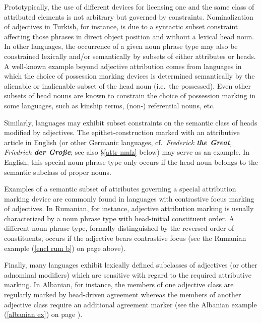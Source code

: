 Prototypically, the use of different devices for licensing one and the same class of attributed elements is not arbitrary but governed by constraints. Nominalization of adjectives in Turkish, for instance, is due to a syntactic subset constraint affecting those phrases in direct object position and without a lexical head noun. In other languages, the occurrence of a given noun phrase type may also be constrained lexically and/or semantically by subsets of either attributes or heads. A well-known example beyond adjective attribution comes from languages in which the choice of possession marking devices is determined semantically by the alienable or inalienable subset of the head noun (i.e.~the possessed). Even other subsets of head nouns are known to constrain the choice of possession marking in some languages, such as kinship terms, (non-) referential nouns, etc.

Similarly, languages may exhibit subset constraints on the semantic class of heads modified by adjectives. The epithet-construction marked with an attributive article in English (or other Germanic languages, cf.~\textit{Frederick \textbf{the Great}, Friedrich \textbf{der Große}}; see also \S\ref{attr nmlz} below) may serve as an example. In English, this special noun phrase type only occurs if the head noun belongs to the semantic subclass of proper nouns. 

Examples of a semantic subset of attributes governing a special attribution marking device are commonly found in languages with contrastive focus marking of adjectives. In Rumanian, for instance, adjective attribution marking is usually characterized by a noun phrase type with head-initial constituent order. A different noun phrase type, formally distinguished by the reversed order of constituents, occurs if the adjective bears contrastive focus (see the Rumanian example (\ref{encl rum b}) on page \pageref{encl rum b} above).

Finally, many languages exhibit lexically defined subclasses of adjectives (or other adnominal modifiers) which are sensitive with regard to the required attributive marking. In Albanian, for instance, the members of one adjective class are regularly marked by head-driven agreement whereas the members of another adjective class require an additional agreement marker (see the Albanian example (\ref{albanian ex}) on page \pageref{albanian synchr}).

